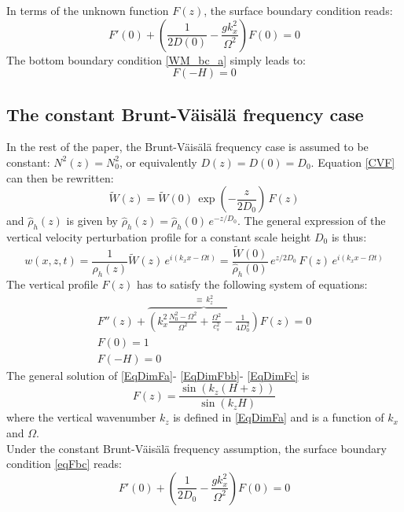 \documentclass[a4paper,11pt]{article}
\begin{document}
In terms of the unknown function $F(z)$, the surface boundary condition reads:
%
\begin{equation}
  \displaystyle
  F'(0)+\left(
  \frac{1}{2D(0)}-\frac{gk_x^2}{\Omega^2}
  \right)F(0)=0
  \label{eqFbc}
\end{equation}
%
The bottom boundary condition \ref{WM_bc_a} simply leads to:
%
\begin{equation}
  \displaystyle
  F(-H)=0
  \label{eqFbc2}
\end{equation}
\subsection{The constant Brunt-V\"ais\"al\"a frequency case}
 \label{SubSectionDisp}
In the rest of the paper, the Brunt-V\"ais\"al\"a frequency case is assumed to be constant: $N^2(z)=N_0^2$, or equivalently $D(z)= D(0)= D_0$. Equation \ref{CVF} can then be rewritten:
 \begin{equation}
 \displaystyle
 \widetilde{W}(z)=\widetilde{W}(0)\, \exp\left(-\frac{z}{2D_0}\right)\,F(z)
 \label{CVF2}
 \end{equation}
 and $\hat{\rho}_h(z)$ is given by $\hat{\rho}_h(z)=\hat{\rho}_h(0)\,e^{-z/D_0}$.
 The general expression of the vertical velocity perturbation profile for a constant scale height $D_0$ is thus:
 \begin{equation}
 \displaystyle
 w(x,z,t)=\frac{1}{\hat{\rho}_h(z)}\widetilde{W}(z)\, e^{i(k_x x-\Omega t)}=\frac{\widetilde{W}(0)}{\hat{\rho}_h(0)}\, e^{z/2D_0}\, F(z)\, e^{i(k_x x-\Omega t)}
 \end{equation}
The vertical profile $F(z)$ has to satisfy the following system of equations:
%
\begin{subequations}
	\label{EqDimF}
	\begin{alignat}{2}	
    \displaystyle
	\label{EqDimFa}
    F''(z)
    +
   \overbrace{ \left(k_x^2\frac{N_0^2-\Omega^2}{\Omega^2}
   +\frac{\Omega^2}{c_s^2}-\frac{1}{4D_0^2}\right)}^{\equiv\, k_z^2}
    F(z)=0\\[4mm]
    \displaystyle
    F(0)=1
    \label{EqDimFbb}
    \\[4mm]
	\label{EqDimFc}
    \displaystyle
    F(-H)=0
  \end{alignat}
\end{subequations}
The general solution of \ref{EqDimFa}- \ref{EqDimFbb}- \ref{EqDimFc} is
%
\begin{equation}
\label{EqDispRef}
\displaystyle
F(z)=\frac{\sin\left(k_z(H+z)\right)}{\sin(k_zH)}
\end{equation}
where the vertical wavenumber $k_z$ is defined in \ref{EqDimFa} and is a function of $k_x$ and $\Omega$.\\
Under the constant Brunt-V\"ais\"al\"a frequency assumption, the surface boundary condition \ref{eqFbc} reads:
\begin{equation}
F'(0)+\left(
\frac{1}{2 D_0}-\frac{gk_x^2}{\Omega^2}
\right) F(0)=0
\label{EqDimFb}
\end{equation}
%
\end{document}

